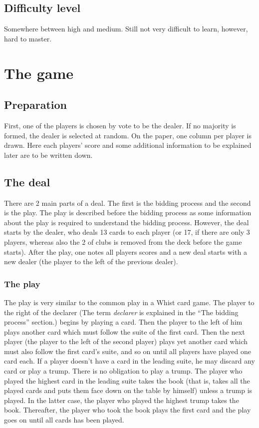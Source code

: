 \documentclass[a4paper]{article}
\begin{document}
		\subsection{Difficulty level}
		Somewhere between high and medium. Still not very difficult to learn, however, hard to master.

	\section{The game}
		\subsection{Preparation}
		First, one of the players is chosen by vote to be the dealer. If no majority is formed, the dealer is selected at random. On the paper, one column per player is drawn. Here each players' score and some additional information to be explained later are to be written down.

		\subsection{The deal}
		There are 2 main parts of a deal. The first is the bidding process and the second is the play. The play is described before the bidding process as some information about the play is required to understand the bidding process. However, the deal starts by the dealer, who deals 13 cards to each player (or 17, if there are only 3 players, whereas also the 2 of clubs is removed from the deck before the game starts). After the play, one notes all players scores and a new deal starts with a new dealer (the player to the left of the previous dealer).
			\subsubsection{The play}
			The play is very similar to the common play in a Whist card game. The player to the right of the declarer (The term \emph{declarer} is explained in the ``The bidding process'' section.) begins by playing a card. Then the player to the left of him plays another card which must follow the suite of the first card. Then the next player (the player to the left of the second player) plays yet another card which must also follow the first card's suite, and so on until all players have played one card each. If a player doesn't have a card in the leading suite, he may discard any card or play a trump. There is no obligation to play a trump. The player who played the highest card in the leading suite takes the book (that is, takes all the played cards and puts them face down on the table by himself) unless a trump is played. In the latter case, the player who played the highest trump takes the book. Thereafter, the player who took the book plays the first card and the play goes on until all cards has been played.
			
\end{document}
